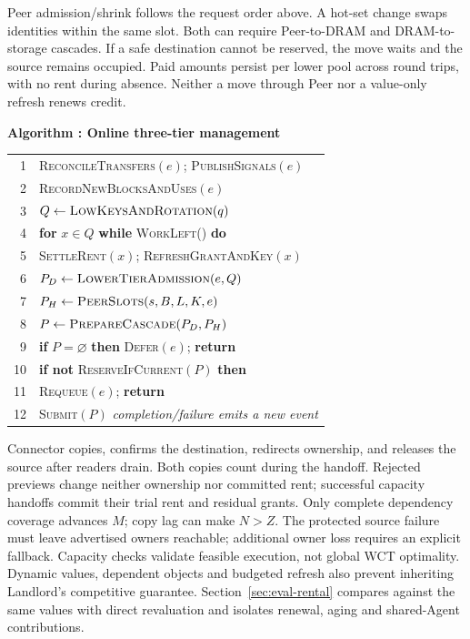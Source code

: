 Peer admission/shrink follows the request order above. A hot-set change
swaps identities within the same slot. Both can require Peer-to-DRAM and
DRAM-to-storage cascades. If a safe destination cannot be reserved, the
move waits and the source remains occupied. Paid amounts persist per
lower pool across round trips, with no rent during absence. Neither a
move through Peer nor a value-only refresh renews credit.

\par\medskip\noindent\begin{minipage}{\columnwidth}
\raggedright
 \label{alg:placement}
 \textbf{Algorithm \thedesignalgorithm: Online three-tier management}
 \par\smallskip
 \begin{tabularx}{\columnwidth}{@{}r@{\quad}X@{}}
 \toprule
 1 & \textsc{ReconcileTransfers}$(e)$; \textsc{PublishSignals}$(e)$ \\
 2 & \textsc{RecordNewBlocksAndUses}$(e)$ \\
 3 & $Q\gets\textsc{LowKeysAndRotation}(q)$ \\
 4 & \textbf{for} $x\in Q$ \textbf{while} \textsc{WorkLeft}() \textbf{do} \\
 5 & \quad \textsc{SettleRent}$(x)$; \textsc{RefreshGrantAndKey}$(x)$ \\
 6 & $P_D\gets\textsc{LowerTierAdmission}(e,Q)$ \\
 7 & $P_H\gets\textsc{PeerSlots}(s,B,L,K,e)$ \\
 8 & $P\gets\textsc{PrepareCascade}(P_D,P_H)$ \\
 9 & \textbf{if} $P=\varnothing$ \textbf{then} \textsc{Defer}$(e)$; \textbf{return} \\
 10 & \textbf{if not} \textsc{ReserveIfCurrent}$(P)$ \textbf{then} \\
 11 & \quad \textsc{Requeue}$(e)$; \textbf{return} \\
 12 & \textsc{Submit}$(P)$ \quad\textit{completion/failure emits a new event} \\
 \bottomrule
 \end{tabularx}
\end{minipage}\par\medskip

Connector copies, confirms the destination, redirects ownership, and
releases the source after readers drain. Both copies count during the
handoff. Rejected previews change neither ownership nor committed rent;
successful capacity handoffs commit their trial rent and residual grants.
Only complete dependency coverage advances $M$; copy lag can make $N>Z$.
The protected source failure must leave advertised owners reachable;
additional owner loss requires an explicit fallback. Capacity checks
validate feasible execution, not global WCT optimality. Dynamic values,
dependent objects and budgeted refresh also prevent inheriting Landlord's
competitive guarantee. Section~\ref{sec:eval-rental} compares against the
same values with direct revaluation and isolates renewal, aging and
shared-Agent contributions.

